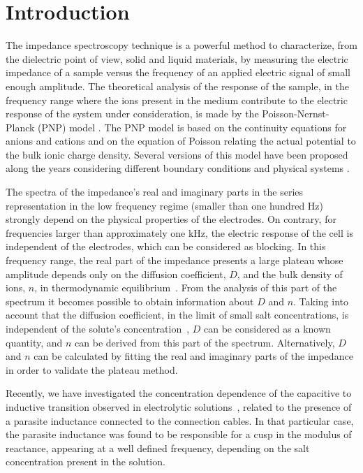 \documentclass[preprint,aps,pre]{revtex4}
\begin{document}
\maketitle

\section{Introduction}
\label{sec:1}

The impedance spectroscopy technique is a powerful method to characterize, from the dielectric point of view, solid and liquid materials, by measuring the electric impedance of a sample versus the frequency of an applied electric signal of small enough amplitude. The theoretical analysis of the response of the sample, in the frequency range where the ions present in the medium contribute to the electric response of the system under consideration, is made by the Poisson-Nernst-Planck (PNP) model \cite{mac,PNP}. The PNP model is based on the continuity equations for anions and cations and on the equation of Poisson relating the actual potential to the bulk ionic charge density. Several versions of this model have been proposed along the years considering different boundary conditions and physical systems \cite{cj,bio1,bio2,cement,mac1,serghei1,serghei2}.

The spectra of the impedance's real and imaginary parts in the series representation in the low frequency regime (smaller than one hundred Hz) strongly depend on the physical properties of the electrodes. On contrary, for frequencies larger than approximately one kHz, the electric response of the cell is independent of the electrodes, which can be considered as blocking. In this frequency range, the real part of the impedance presents a large plateau whose amplitude depends only on the diffusion coefficient, $D$, and the bulk density of ions, $n$, in thermodynamic equilibrium~\cite{alai}. From the analysis of this part of the spectrum it becomes possible to obtain information about $D$ and $n$. Taking into account that the diffusion coefficient, in the limit of small salt concentrations, is independent of the solute's concentration~\cite{atkins}, $D$ can be considered as a known quantity, and $n$ can be derived from this part of the spectrum. Alternatively, $D$ and $n$ can be calculated by fitting the real and imaginary parts of the impedance in order to validate the plateau method.

Recently, we have investigated the concentration dependence of the capacitive to inductive transition observed in electrolytic solutions~\cite{JML}, related to the presence of a parasite inductance connected to the connection cables. In that particular case, the parasite inductance was found to be responsible for a cusp in the modulus of reactance, appearing at a well defined frequency, depending on the salt concentration present in the solution.
\end{document}
